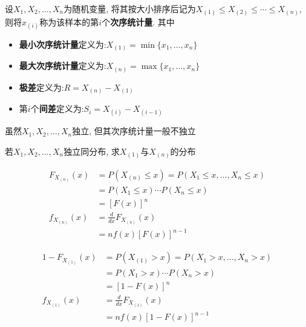 \begin{definition}
    设$X_1,X_2,\dotsc,X_n$为随机变量, 将其按大小排序后记为$X_{(1)}\le X_{(2)} \le  \cdots \le X_{(n)}$, 则将$x_{(i)}$称为该样本的第$i$个\textbf{次序统计量}. 其中
    \begin{itemize}
        \item \textbf{最小次序统计量}定义为:$X_{(1)}=\min\{x_1,\dotsc,x_n\}$
        \item \textbf{最大次序统计量}定义为:$X_{(n)}=\max\{x_1,\dotsc,x_n\}$
        \item \textbf{极差}定义为:$R=X_{(n)}-X_{(1)}$
        \item 第$i$个\textbf{间差}定义为:$S_i=X_{(i)}-X_{(i-1)}$
    \end{itemize}
\end{definition}

\begin{remark}
    虽然$X_1,X_2,\dotsc,X_n$独立, 但其次序统计量一般不独立
\end{remark}

\begin{example}
    若$X_1,X_2,\dotsc,X_n$独立同分布, 求$X_{(1)}$与$X_{(n)}$的分布
\end{example}

\begin{solution}
    \begin{align*}
        F_{X_{(n)}}(x) & =P(X_{(n)} \leq x)=P(X_{1} \leq x, \ldots, X_{n} \leq x) \\
                       & =P(X_{1} \leq x) \cdots P(X_{n} \leq x)                  \\
                       & =[F(x)]^{n}                                              \\
        f_{X_{(n)}}(x) & = \frac{d}{dx}F_{X_{(n)}}(x)                             \\
                       & =nf(x)[F(x)]^{n-1}
    \end{align*}

    \begin{align*}
        1-F_{X_{(1)}}(x) & =P(X_{(1)}>x)=P(X_{1}>x, \ldots, X_{n}>x) \\
                         & =P(X_{1}>x)\cdots P(X_{n}>x)              \\
                         & =[1-F(x)]^{n}                             \\
        f_{X_{(1)}}(x)   & = \frac{d}{dx}F_{X_{(1)}}(x)              \\
                         & =nf(x)[1-F(x)]^{n-1}
    \end{align*}
\end{solution}

